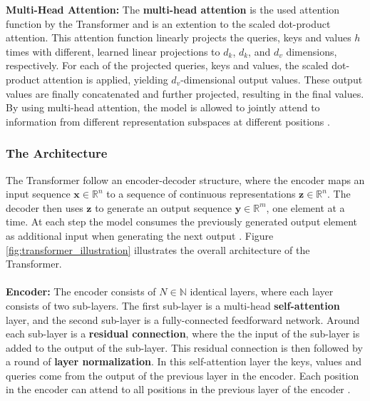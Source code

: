 \documentclass[./main.tex]{subfiles}
\begin{document}
\textbf{Multi-Head Attention:} The \textbf{multi-head attention} is the used attention function by the Transformer and is an extention to the scaled dot-product attention. This attention function linearly projects the queries, keys and values $h$ times with different, learned linear projections to $d_k$, $d_k$, and $d_v$ dimensions, respectively. For each of the projected queries, keys and values, the scaled dot-product attention is applied, yielding $d_v$-dimensional output values. These output values are finally concatenated and further projected, resulting in the final values. By using multi-head attention, the model is allowed to jointly attend to information from different representation subspaces at different positions \cite{https://doi.org/10.48550/arxiv.1706.03762}.

\subsubsection{The Architecture}
The Transformer follow an encoder-decoder structure, where the encoder maps an input sequence $\bm{x} \in \mathbb{R}^n$ to a sequence of continuous representations $\bm{z} \in \mathbb{R}^n$. The decoder then uses $\bm{z}$ to generate an output sequence $\bm{y} \in \mathbb{R}^m$, one element at a time. At each step the model consumes the previously generated output element as additional input when generating the next output \cite{https://doi.org/10.48550/arxiv.1706.03762}. Figure \ref{fig:transformer_illustration} illustrates the overall architecture of the Transformer.
\\
\\
\noindent \textbf{Encoder:} The encoder consists of $N \in \mathbb{N}$ identical layers, where each layer consists of two sub-layers. The first sub-layer is a multi-head \textbf{self-attention} layer, and the second sub-layer is a fully-connected feedforward network. Around each sub-layer is a \textbf{residual connection}, where the the input of the sub-layer is added to the output of the sub-layer. This residual connection is then followed by a round of \textbf{layer normalization}. In this self-attention layer the keys, values and queries come from the output of the previous layer in the encoder. Each position in the encoder can attend to all positions in the previous layer of the encoder \cite{https://doi.org/10.48550/arxiv.1706.03762}.
\\
\\
\end{document}
